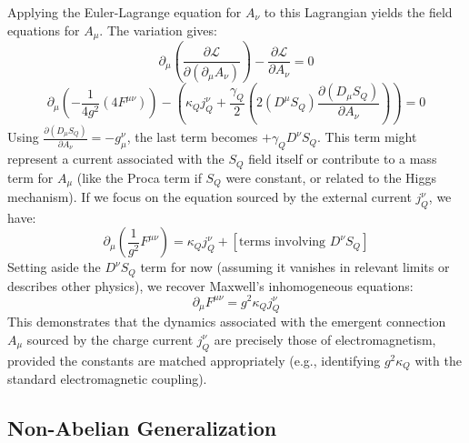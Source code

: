 \documentclass[11pt]{article}
\begin{document}
Applying the Euler-Lagrange equation for $A_\nu$ to this Lagrangian yields the field equations for $A_\mu$. The variation gives:
\begin{equation*}
\partial_\mu \left( \frac{\partial \mathcal{L}}{\partial (\partial_\mu A_\nu)} \right) - \frac{\partial \mathcal{L}}{\partial A_\nu} = 0
\end{equation*}
\begin{equation*}
\partial_\mu \left( -\frac{1}{4g^2} (4 F^{\mu\nu}) \right) - \left( \kappa_Q j^\nu_Q + \frac{\gamma_Q}{2} (2 (D^\mu S_Q) \frac{\partial (D_\mu S_Q)}{\partial A_\nu}) \right) = 0
\end{equation*}
Using $\frac{\partial(D_\mu S_Q)}{\partial A_\nu} = -g_\mu^\nu$, the last term becomes $+\gamma_Q D^\nu S_Q$. This term might represent a current associated with the $S_Q$ field itself or contribute to a mass term for $A_\mu$ (like the Proca term if $S_Q$ were constant, or related to the Higgs mechanism). If we focus on the equation sourced by the external current $j^\nu_Q$, we have:
\begin{equation*}
\partial_\mu \left( \frac{1}{g^2} F^{\mu\nu} \right) = \kappa_Q j^\nu_Q + [\text{terms involving } D^\nu S_Q]
\end{equation*}
Setting aside the $D^\nu S_Q$ term for now (assuming it vanishes in relevant limits or describes other physics), we recover Maxwell's inhomogeneous equations:
\begin{equation}
\partial_\mu F^{\mu\nu} = g^2 \kappa_Q j^\nu_Q \label{eq:maxwell_Q_app}
\end{equation}
This demonstrates that the dynamics associated with the emergent connection $A_\mu$ sourced by the charge current $j^\nu_Q$ are precisely those of electromagnetism, provided the constants are matched appropriately (e.g., identifying $g^2 \kappa_Q$ with the standard electromagnetic coupling).

\subsection{Non-Abelian Generalization}
\end{document}
